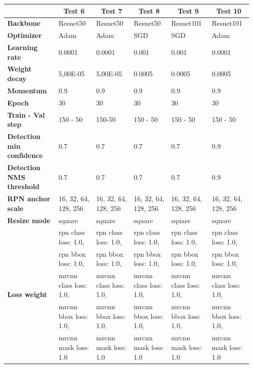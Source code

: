 	
	\begin{longtable}[c]{|p{}|p{}|p{}|p{}|p{}|p{}|}
		\hline
		& \multicolumn{1}{c|}{\textbf{Test 6}} & \multicolumn{1}{c|}{\textbf{Test 7}} & \multicolumn{1}{c|}{\textbf{Test 8}} & \multicolumn{1}{c|}{\textbf{Test 9}} & \multicolumn{1}{c|}{\textbf{Test 10}} \\ \hline
		\endhead
		\textbf{Backbone} & Resnet50 & Resnet50 & Resnet50 & Resnet101 & Resnet101 \\ \hline
		\textbf{Optimizer} & Adam & Adam & SGD & SGD & Adam \\ \hline
		\textbf{Learning rate} & 0.0001 & 0.0001 & 0.001 & 0.001 & 0.0001 \\ \hline
		\textbf{Weight decay} & 5,00E-05 & 5,00E-05 & 0.0005 & 0.0005 & 0.0005 \\ \hline
		\textbf{Momentum} & 0.9 & 0.9 & 0.9 & 0.9 & 0.9 \\ \hline
		\textbf{Epoch} & 30 & 30 & 30 & 30 & 30 \\ \hline
		\textbf{Train - Val step} & 150 - 50 & 150-50 & 150 - 50 & 150 - 50 & 150 - 50 \\ \hline
		\textbf{Detection min confidence} & 0.7 & 0.7 & 0.7 & 0.7 & 0.9 \\ \hline
		\textbf{Detection NMS threshold} & 0.7 & 0.7 & 0.7 & 0.7 & 0.9 \\ \hline
		\textbf{RPN anchor scale} & 16, 32, 64, 128, 256 & 16, 32, 64, 128, 256 & 16, 32, 64, 128, 256 & 16, 32, 64, 128, 256 & 16, 32, 64, 128, 256 \\ \hline
		\textbf{Resize mode} & square & square & square & square & square \\ \hline
		
		\multirow{6}{*}{\textbf{Loss weight}} & rpn class loss: 1.0, & rpn class loss: 1.0, & rpn class loss: 1.0, & rpn class loss: 1.0, & rpn class loss: 1.0, \\ \cline{2-6} 
		& rpn bbox loss: 1.0, & rpn bbox loss: 1.0, & rpn bbox loss: 1.0, & rpn bbox loss: 1.0, & rpn bbox loss: 1.0, \\ \cline{2-6} 
		& mrcnn class loss: 1.0, & mrcnn class loss: 1.0, & mrcnn class loss: 1.0, & mrcnn class loss: 1.0, & mrcnn class loss: 1.0, \\ \cline{2-6} 
		& mrcnn bbox loss: 1.0, & mrcnn bbox loss: 1.0, & mrcnn bbox loss: 1.0, & mrcnn bbox loss: 1.0, & mrcnn bbox loss: 1.0, \\ \cline{2-6} 
		& mrcnn mask loss: 1.0 & mrcnn mask loss: 1.0 & mrcnn mask loss: 1.0 & mrcnn mask loss: 1.0 & mrcnn mask loss: 1.0 \\  \hline
		

\end{longtable}
